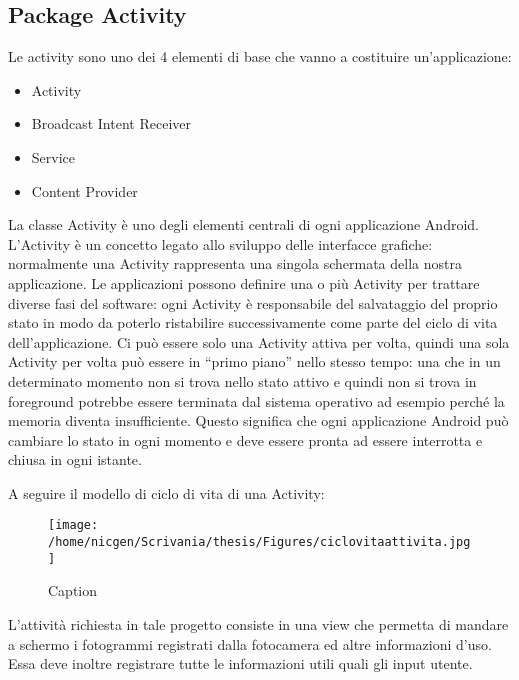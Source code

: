 \subsection{Package Activity}

Le activity sono uno dei 4 elementi di base che vanno a costituire un'applicazione:

\begin{itemize}
\item Activity
\item Broadcast Intent Receiver
\item Service
\item Content Provider
\end{itemize}

La classe Activity è uno degli elementi centrali di ogni applicazione Android. L'Activity è un concetto legato allo sviluppo delle interfacce grafiche: normalmente una Activity rappresenta una singola schermata della nostra applicazione. Le applicazioni possono definire una o più Activity per trattare diverse fasi del software: ogni Activity è responsabile del salvataggio del proprio stato in modo da poterlo ristabilire successivamente come parte del ciclo di vita dell'applicazione.
Ci può essere solo una Activity attiva per volta, quindi una sola Activity per volta può essere in “primo piano” nello stesso tempo: una che in un determinato momento non si trova nello stato attivo e quindi non si trova in foreground potrebbe essere terminata dal sistema operativo ad esempio perché la memoria diventa insufficiente. Questo significa che ogni applicazione Android può cambiare lo stato in ogni momento e deve essere pronta ad essere interrotta e chiusa in ogni istante.

A seguire il modello di ciclo di vita di una Activity:

\begin{figure}[h]\centering  
\texttt{[image: /home/nicgen/Scrivania/thesis/Figures/ciclovitaattivita.jpg]}
\caption[Long caption]{Caption}
\label{pic-a}
\end{figure}

L'attività richiesta in tale progetto consiste in una view che permetta di mandare a schermo i fotogrammi registrati dalla fotocamera ed altre informazioni d'uso. Essa deve inoltre registrare tutte le informazioni utili quali gli input utente.

